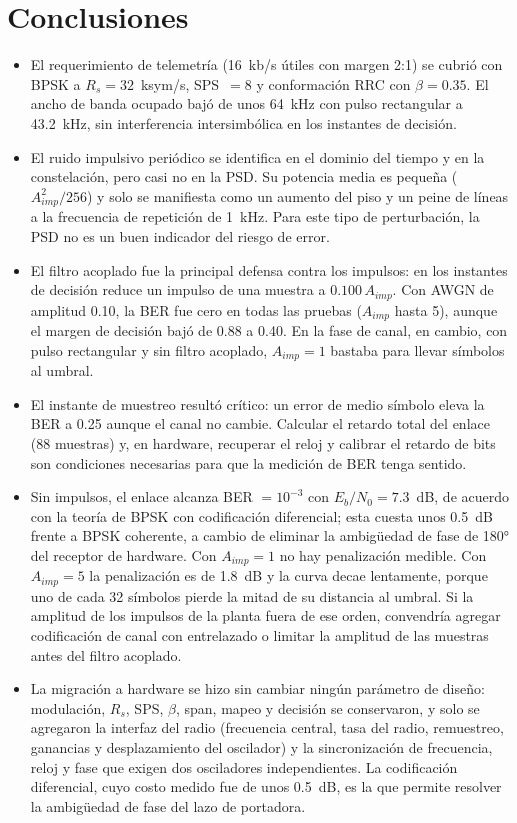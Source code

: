 \section{Conclusiones}
\label{sec:conclusiones}

\begin{itemize}
    \item El requerimiento de telemetría (16~kb/s útiles con margen 2:1) se cubrió con BPSK a $R_s=32$~ksym/s, SPS~$=8$ y conformación RRC con $\beta=0.35$. El ancho de banda ocupado bajó de unos 64~kHz con pulso rectangular a 43.2~kHz, sin interferencia intersimbólica en los instantes de decisión.
    \item El ruido impulsivo periódico se identifica en el dominio del tiempo y en la constelación, pero casi no en la PSD. Su potencia media es pequeña ($A_{imp}^2/256$) y solo se manifiesta como un aumento del piso y un peine de líneas a la frecuencia de repetición de 1~kHz. Para este tipo de perturbación, la PSD no es un buen indicador del riesgo de error.
    \item El filtro acoplado fue la principal defensa contra los impulsos: en los instantes de decisión reduce un impulso de una muestra a $0.100\,A_{imp}$. Con AWGN de amplitud 0.10, la BER fue cero en todas las pruebas ($A_{imp}$ hasta 5), aunque el margen de decisión bajó de 0.88 a 0.40. En la fase de canal, en cambio, con pulso rectangular y sin filtro acoplado, $A_{imp}=1$ bastaba para llevar símbolos al umbral.
    \item El instante de muestreo resultó crítico: un error de medio símbolo eleva la BER a 0.25 aunque el canal no cambie. Calcular el retardo total del enlace (88 muestras) y, en hardware, recuperar el reloj y calibrar el retardo de bits son condiciones necesarias para que la medición de BER tenga sentido.
    \item Sin impulsos, el enlace alcanza BER $=10^{-3}$ con $E_b/N_0=7.3$~dB, de acuerdo con la teoría de BPSK con codificación diferencial; esta cuesta unos 0.5~dB frente a BPSK coherente, a cambio de eliminar la ambigüedad de fase de 180° del receptor de hardware. Con $A_{imp}=1$ no hay penalización medible. Con $A_{imp}=5$ la penalización es de 1.8~dB y la curva decae lentamente, porque uno de cada 32 símbolos pierde la mitad de su distancia al umbral. Si la amplitud de los impulsos de la planta fuera de ese orden, convendría agregar codificación de canal con entrelazado o limitar la amplitud de las muestras antes del filtro acoplado.
    \item La migración a hardware se hizo sin cambiar ningún parámetro de diseño: modulación, $R_s$, SPS, $\beta$, span, mapeo y decisión se conservaron, y solo se agregaron la interfaz del radio (frecuencia central, tasa del radio, remuestreo, ganancias y desplazamiento del oscilador) y la sincronización de frecuencia, reloj y fase que exigen dos osciladores independientes. La codificación diferencial, cuyo costo medido fue de unos 0.5~dB, es la que permite resolver la ambigüedad de fase del lazo de portadora.

\end{itemize}
